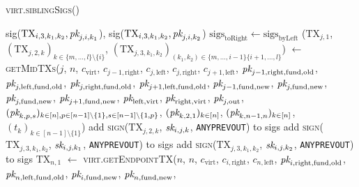 \begin{center}
\begin{processbox}{\textsc{virt.siblingSigs}()}
\begin{algorithmic}[1]
        \Indent
          \State sig($\mathrm{TX}_{i, 3, k_1, k_2}, \textit{pk}_{j, i, k_1}$),
          sig($\mathrm{TX}_{i, 3, k_1, k_2}, \textit{pk}_{j, i, k_2}$)
        \EndIndent
      \EndIndent
      \State $\mathrm{sigs}_{\mathrm{toRight}} \gets
      \mathrm{sigs}_{\mathrm{byLeft}}$
      \Statex
        \State ($\mathrm{TX}_{j, 1}$, $(\mathrm{TX}_{j, 2, k})_{k \in \{m,
        \dots, l\} \setminus \{i\}}$, $(\mathrm{TX}_{j, 3, k_1, k_2})_{(k_1,
        k_2) \in \{m, \dots, i-1\} \{i+1, \dots, l\}}$) $\gets$
        \textsc{getMidTXs}($j$, $n$, $c_{\mathrm{virt}}$, $c_{j-1,
        \mathrm{right}}$, $c_{j, \mathrm{left}}$, $c_{j, \mathrm{right}}$,
        $c_{j+1, \mathrm{left}}$, $\textit{pk}_{j-1, \mathrm{right}, \mathrm{fund},
        \mathrm{old}}$, $\textit{pk}_{j, \mathrm{left}, \mathrm{fund}, \mathrm{old}}$,
        $\textit{pk}_{j, \mathrm{right}, \mathrm{fund}, \mathrm{old}}$, $\textit{pk}_{j+1,
        \mathrm{left}, \mathrm{fund}, \mathrm{old}}$, $\textit{pk}_{j-1, \mathrm{fund},
        \mathrm{new}}$, $\textit{pk}_{j, \mathrm{fund}, \mathrm{new}}$, $\textit{pk}_{j,
        \mathrm{fund}, \mathrm{new}}$, $\textit{pk}_{j+1, \mathrm{fund}, \mathrm{new}}$,
        $\textit{pk}_{\mathrm{left}, \mathrm{virt}}$, $\textit{pk}_{\mathrm{right},
        \mathrm{virt}}$, $\textit{pk}_{j, \mathrm{out}}$, $(\textit{pk}_{k, p,
        s})_{k \in [n], p \in [n-1] \setminus \{1\}, s \in [n-1] \setminus \{1,
        p\}}$, $(\textit{pk}_{k, 2, 1})_{k \in [n]}$, $(\textit{pk}_{k, n-1, n})_{k \in [n]}$,
        $(t_k)_{k \in [n-1] \setminus \{1\}}$)
          \State add \textsc{sign}($\mathrm{TX}_{j, 2, k}$, $\textit{sk}_{i, j, k}$,
          \texttt{ANYPREVOUT}) to sigs
        \EndFor
          \State add \textsc{sign}($\mathrm{TX}_{j, 3, k_1, k_2}$, $\textit{sk}_{i, j,
          k_1}$, \texttt{ANYPREVOUT}) to sigs
          \State add \textsc{sign}($\mathrm{TX}_{j, 3, k_1, k_2}$, $\textit{sk}_{i, j,
          k_2}$, \texttt{ANYPREVOUT}) to sigs
        \EndFor
      \EndFor
       
        \State $\mathrm{TX}_{n, 1}$ $\gets$ \textsc{virt.getEndpointTX}($n$,
        $n$, $c_{\mathrm{virt}}$, $c_{i, \mathrm{right}}$, $c_{n,
        \mathrm{left}}$, $\textit{pk}_{i, \mathrm{right}, \mathrm{fund}, \mathrm{old}}$,
        $\textit{pk}_{n, \mathrm{left}, \mathrm{fund}, \mathrm{old}}$, $\textit{pk}_{i,
        \mathrm{fund}, \mathrm{new}}$, $\textit{pk}_{n, \mathrm{fund}, \mathrm{new}}$,

\end{algorithmic}
\end{processbox}
\end{center}
